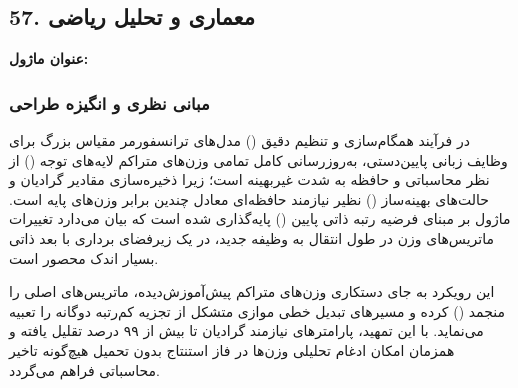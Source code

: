 

\subsection*{57. معماری و تحلیل ریاضی }
\textbf{عنوان ماژول:} 

\subsubsection*{مبانی نظری و انگیزه طراحی}
در فرآیند همگام‌سازی و تنظیم دقیق () مدل‌های ترانسفورمر مقیاس بزرگ برای وظایف زبانی پایین‌دستی، به‌روزرسانی کامل تمامی وزن‌های متراکم لایه‌های توجه () از نظر محاسباتی و حافظه به شدت غیربهینه است؛ زیرا ذخیره‌سازی مقادیر گرادیان و حالت‌های بهینه‌ساز () نظیر  نیازمند حافظه‌ای معادل چندین برابر وزن‌های پایه است. ماژول  بر مبنای فرضیه رتبه ذاتی پایین () پایه‌گذاری شده است که بیان می‌دارد تغییرات ماتریس‌های وزن در طول انتقال به وظیفه جدید، در یک زیرفضای برداری با بعد ذاتی بسیار اندک محصور است.

این رویکرد به جای دستکاری وزن‌های متراکم پیش‌آموزش‌دیده، ماتریس‌های اصلی را منجمد () کرده و مسیرهای تبدیل خطی موازی متشکل از تجزیه کم‌رتبه دوگانه را تعبیه می‌نماید. با این تمهید، پارامترهای نیازمند گرادیان تا بیش از ۹۹ درصد تقلیل یافته و همزمان امکان ادغام تحلیلی وزن‌ها در فاز استنتاج بدون تحمیل هیچ‌گونه تاخیر محاسباتی فراهم می‌گردد.

